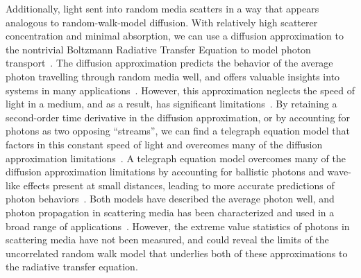Additionally, light sent into random media scatters in a way that appears analogous to random-walk-model diffusion. With relatively high scatterer concentration and minimal absorption, we can use a diffusion approximation to the nontrivial Boltzmann Radiative Transfer Equation to model photon transport~\cite{ishimaru_wave_1997,haskell_boundary_1994}. 
The diffusion approximation predicts the behavior of the average photon travelling through random media well, and offers valuable insights into systems in many applications~\cite{haskell_boundary_1994,  chandrasekhar_stochastic_1943,chandrasekhar_radiative_1950,  brown_light_1975, allgaier_diffuse_2021, taitelbaum_diagnosis_1999, amendola_accuracy_2021}. However, this approximation neglects the speed of light in a medium, and as a result, has significant limitations~\cite{yoo_when_1990, zhang_wave_2002, pierrat_photon_2006}.
By retaining a second-order time derivative in the diffusion approximation, or by accounting for photons as two opposing ``streams'', we can find a telegraph equation model that factors in this constant speed of light and overcomes many of the diffusion approximation limitations~\cite{durian_photon_1997,lemieux_diffusing-light_1998}.
A telegraph equation model overcomes many of the diffusion approximation limitations by accounting for ballistic photons and wave-like effects present at small distances, leading to more accurate predictions of photon behaviors~\cite{goldstein_diffusion_1951, durian_two-stream_1996, durian_photon_1997, lemieux_diffusing-light_1998, masoliver_solutions_1992, masoliver_finite-velocity_1996, das_non-fickian_1998, polishchuk_photon-density_1997}. 
Both models have described the average photon well, and photon propagation in scattering media has been characterized and used in a broad range of applications~\cite{haskell_boundary_1994,ishimaru_wave_1997,lemieux_diffusing-light_1998,masoliver_finite-velocity_1996,brown_light_1975,allgaier_diffuse_2021,taitelbaum_diagnosis_1999}. However, the extreme value statistics of photons in scattering media have not been measured, and could reveal the limits of the uncorrelated random walk model that underlies both of these approximations to the radiative transfer equation.
